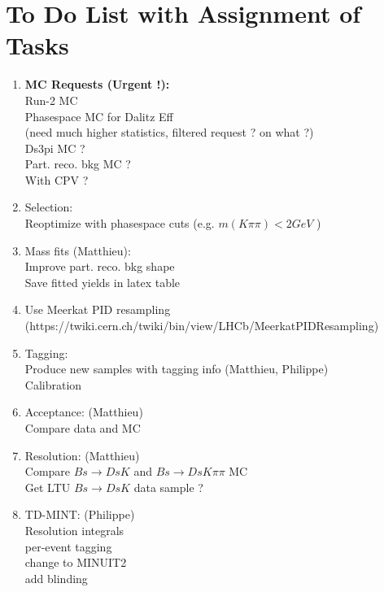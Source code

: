 
\setcounter{section}{-1}
\clearpage

\section{To Do List with Assignment of Tasks}

\begin{enumerate}
	\item \textbf{MC Requests (Urgent !):}
	\\ Run-2 MC 
	\\ Phasespace MC for Dalitz Eff  \\(need much higher statistics, filtered request ? on what ?)
	\\ Ds\to3pi MC ?
	\\ Part. reco. bkg MC ?
	\\ With CPV ?
	\item Selection:
	\\ Reoptimize with phasespace cuts (e.g. $m(K\pi\pi) < 2 GeV$  )  {\Large\color{darkgreen}\checkmark} 
	\item Mass fits (Matthieu):
	\\ Improve part. reco. bkg shape 
	\\ Save fitted yields in latex table {\Large\color{darkgreen}\checkmark}
	\item Use Meerkat PID resampling   {\Large\color{darkgreen}\checkmark} 
	\\ (https://twiki.cern.ch/twiki/bin/view/LHCb/MeerkatPIDResampling) 
	\item Tagging:
	\\ Produce new samples with tagging info (Matthieu, Philippe)   {\Large\color{darkgreen}\checkmark} 
	\\ Calibration 
	\item Acceptance: (Matthieu) 
	\\ Compare data and MC {\Large\color{darkgreen}\checkmark}
	\item Resolution: (Matthieu) 
	\\ Compare $Bs\to Ds K$ and $Bs\to Ds K \pi \pi$ MC {\Large\color{darkgreen}\checkmark}
	\\ Get LTU $Bs\to Ds K$ data sample ?
	\item TD-MINT: (Philippe)  
	\\ Resolution integrals  {\Large\color{darkgreen}\checkmark} 
	\\ per-event tagging
	\\ change to MINUIT2
	\\ add blinding 
\end{enumerate}





\clearpage

